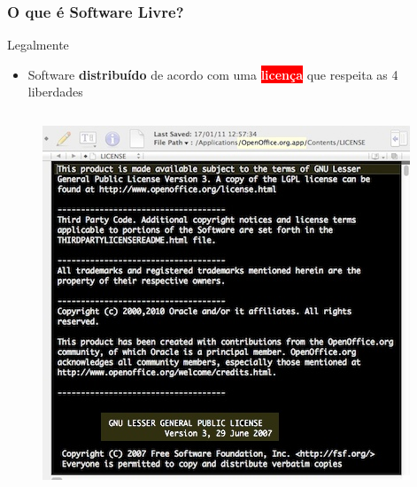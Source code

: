 \documentclass[xcolor=dvipsnames]{beamer}
\newcommand{\bred}[1]{\colorbox{red}{\textcolor{white}{#1}}}
\begin{document}
\begin{frame}
	\frametitle{O que é Software Livre?}
	\begin{block}{Legalmente}
		  \begin{itemize}
		    \item Software \textbf{distribuído} de acordo com uma 
\bred{\bf licença} que respeita as 4 liberdades
		  \end{itemize}
		  
	\end{block}
	\begin{columns}
\begin{column}{7cm}
	\begin{figure}
	\includegraphics[scale=0.35]{licenca-oo.jpg}\\
	\end{figure}
\end{column}


\end{columns}
\end{frame}
\end{document}
